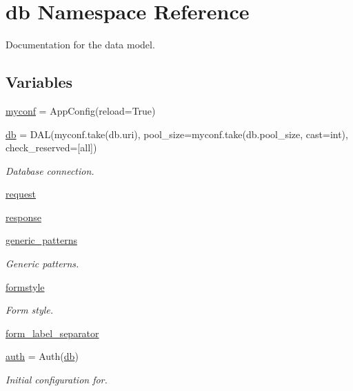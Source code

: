 \hypertarget{namespacedb}{}\section{db Namespace Reference}
\label{namespacedb}


Documentation for the data model.  


\subsection*{Variables}
\begin{DoxyCompactItemize}
\item 
\hyperlink{namespacedb_a33a87b881032e95df300a5a29215a486}{myconf} = App\+Config(reload=True)
\item 
\hyperlink{namespacedb_aed82679f33f702c99769be3e2586c03b}{db} = D\+AL(myconf.\+take(\textquotesingle{}db.\+uri\textquotesingle{}), pool\+\_\+size=myconf.\+take(\textquotesingle{}db.\+pool\+\_\+size\textquotesingle{}, cast=int), check\+\_\+reserved=\mbox{[}\textquotesingle{}all\textquotesingle{}\mbox{]})
\begin{DoxyCompactList}\small\item\em Database connection. \end{DoxyCompactList}\item 
\hyperlink{namespacedb_a0df56b5899dd931e8a9ed1fadf891ad1}{request}
\item 
\hyperlink{namespacedb_aeaa08bcae1a7c3c251e233d65ec72775}{response}
\item 
\hyperlink{namespacedb_ac1917cb3a4b16c7ac25158e93e51c52e}{generic\+\_\+patterns}
\begin{DoxyCompactList}\small\item\em Generic patterns. \end{DoxyCompactList}\item 
\hyperlink{namespacedb_ab68a30ce13011c7ceb6091ce5557ae1b}{formstyle}
\begin{DoxyCompactList}\small\item\em Form style. \end{DoxyCompactList}\item 
\hyperlink{namespacedb_a638d59d03b2f6ef1306f0651967b2d6b}{form\+\_\+label\+\_\+separator}
\item 
\hyperlink{namespacedb_a711411a4b59aaa146400d3a3a950d6f8}{auth} = Auth(\hyperlink{namespacedb_aed82679f33f702c99769be3e2586c03b}{db})
\begin{DoxyCompactList}\small\item\em Initial configuration for. \end{DoxyCompactList}\item 

\end{DoxyCompactItemize}
